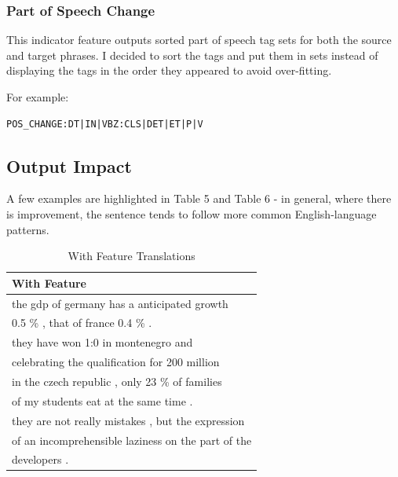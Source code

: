 \documentclass[11pt]{article}
\begin{document}
\subsubsection{Part of Speech Change}

This indicator feature outputs sorted part of speech tag sets for both the source
 and target phrases.  I decided to sort the tags and put them in sets instead of
 displaying the tags in the order they appeared to avoid over-fitting.

For example: 

\begin{verbatim}
POS_CHANGE:DT|IN|VBZ:CLS|DET|ET|P|V
\end{verbatim}

\subsection{Output Impact}

A few examples are highlighted in Table 5
and Table 6 - in general, where there is improvement,
the sentence tends to follow more common English-language
patterns.

\begin{table}
  \begin{center}
    \begin{tabular}{ l }
      \hline
        \textbf{With Feature} \\
      \hline
        the gdp of germany has a anticipated growth \\ 
        0.5 \% , that of france 0.4 \% . \\
      \hline
        they have won 1:0 in montenegro and\\
        celebrating the qualification for 200 million\\
      \hline
        in the czech republic , only 23 \% of families\\
        of my students eat at the same time .\\
      \hline
        they are not really mistakes , but the expression\\
        of an incomprehensible laziness on the part of the\\
         developers .\\
      \hline
    \end{tabular}
  \end{center}
  \caption{With Feature Translations}
\end{table}
\end{document}
